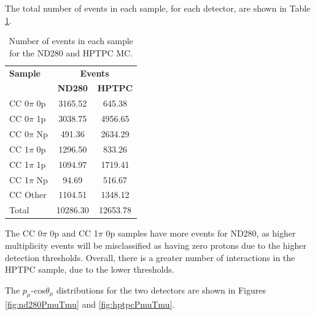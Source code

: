 The total number of events in each sample, for each detector, are shown in Table \ref{tab:hptpcrates}.

\begin{center}
\begin{table}
\center
\begin{tabular}{l ||c c}
\hline \hline
\textbf{Sample} & \multicolumn{2}{c}{\textbf{Events}}\\
 & \textbf{ND280} & \textbf{HPTPC} \\
 \hline \hline
CC 0$\pi$ 0p & 3165.52 & 645.38 \\
CC 0$\pi$ 1p & 3038.75 & 4956.65 \\
CC 0$\pi$ Np & 491.36 & 2634.29 \\
CC 1$\pi$ 0p & 1296.50 & 833.26 \\
CC 1$\pi$ 1p & 1094.97 & 1719.41\\
CC 1$\pi$ Np & 94.69 & 516.67 \\
CC Other & 1104.51 & 1348.12 \\
\hline
Total & 10286.30 & 12653.78 \\
\hline \hline
\end{tabular}
\caption{Number of events in each sample for the ND280 and HPTPC MC.}
\label{tab:hptpcrates}
\end{table}
\end{center}

The CC 0$\pi$ 0p and CC 1$\pi$ 0p samples have more events for ND280, as higher multiplicity events will be misclassified as having zero protons due to the higher detection thresholds. Overall, there is a greater number of interactions in the HPTPC sample, due to the lower thresholds.

The $p_{\mu}$-cos$\theta_{\mu}$ distributions for the two detectors are shown in Figures \ref{fig:nd280PmuTmu} and \ref{fig:hptpcPmuTmu}.

